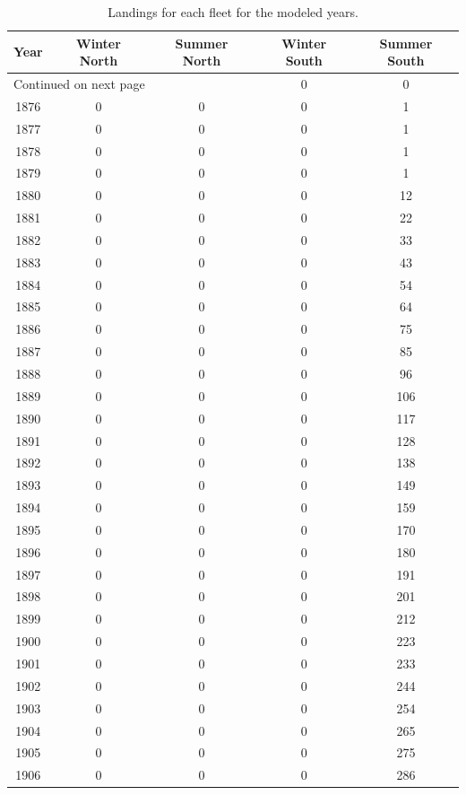 \documentclass[12pt,]{article}
\begin{document}
\begin{center}
\begin{longtable}{ccccc}
\caption{Landings for each fleet for the modeled years.} \\ 
  \hline
Year & Winter North & Summer North & Winter South & Summer South \\ 
  \hline 
\endhead 
\hline 
\multicolumn{3}{l}{\footnotesize Continued on next page} 
\endfoot 
\endlastfoot 
 \hline
1875 & 0 & 0 & 0 & 0 \\ 
  1876 & 0 & 0 & 0 & 1 \\ 
  1877 & 0 & 0 & 0 & 1 \\ 
  1878 & 0 & 0 & 0 & 1 \\ 
  1879 & 0 & 0 & 0 & 1 \\ 
  1880 & 0 & 0 & 0 & 12 \\ 
  1881 & 0 & 0 & 0 & 22 \\ 
  1882 & 0 & 0 & 0 & 33 \\ 
  1883 & 0 & 0 & 0 & 43 \\ 
  1884 & 0 & 0 & 0 & 54 \\ 
  1885 & 0 & 0 & 0 & 64 \\ 
  1886 & 0 & 0 & 0 & 75 \\ 
  1887 & 0 & 0 & 0 & 85 \\ 
  1888 & 0 & 0 & 0 & 96 \\ 
  1889 & 0 & 0 & 0 & 106 \\ 
  1890 & 0 & 0 & 0 & 117 \\ 
  1891 & 0 & 0 & 0 & 128 \\ 
  1892 & 0 & 0 & 0 & 138 \\ 
  1893 & 0 & 0 & 0 & 149 \\ 
  1894 & 0 & 0 & 0 & 159 \\ 
  1895 & 0 & 0 & 0 & 170 \\ 
  1896 & 0 & 0 & 0 & 180 \\ 
  1897 & 0 & 0 & 0 & 191 \\ 
  1898 & 0 & 0 & 0 & 201 \\ 
  1899 & 0 & 0 & 0 & 212 \\ 
  1900 & 0 & 0 & 0 & 223 \\ 
  1901 & 0 & 0 & 0 & 233 \\ 
  1902 & 0 & 0 & 0 & 244 \\ 
  1903 & 0 & 0 & 0 & 254 \\ 
  1904 & 0 & 0 & 0 & 265 \\ 
  1905 & 0 & 0 & 0 & 275 \\ 
  1906 & 0 & 0 & 0 & 286 \\ 

\end{longtable}
\end{center}
\end{document}
